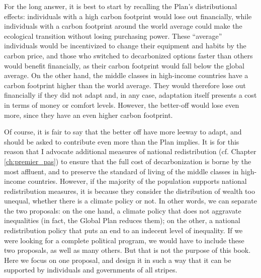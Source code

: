 \documentclass[a5paper,english,openany]{memoir}
\begin{document}
For the long answer, it is best to %
start by recalling the Plan's distributional effects: individuals with a high carbon footprint would lose out financially, while individuals with a carbon footprint around the world average could make the ecological transition %
without losing purchasing power. These ``average'' individuals would be incentivized %
to change their equipment and habits by the carbon price, and those who switched to decarbonized %
options faster than others would benefit financially, as their carbon footprint would fall below the global average. %
On the other hand, the middle classes in high-income countries have a carbon footprint higher %
than the world average. %
They would therefore lose out financially if they did not adapt and, in any case, adaptation itself presents a cost in terms of money or comfort levels. %
However, the better-off would lose even more, since they have an even higher carbon footprint. 

Of course, it is fair to say that the better off %
have more leeway to adapt, and should be asked to contribute even more than the Plan implies. It is for this reason that I advocate additional measures of national redistribution (cf. Chapter \ref{ch:premier_pas}) to ensure that the full cost of decarbonization %
is borne by the most affluent, and to preserve the standard of living of the middle classes in high-income countries. However, if the majority of the population supports national redistribution measures, it is because they consider the distribution of wealth too unequal, whether there is a climate policy or not. In other words, we can separate the two proposals: on the one hand, a climate policy that does not aggravate inequalities (in fact, the Global Plan reduces them); on the other, a national redistribution policy that puts an end to an indecent level of inequality. If we were looking for a complete political program, we would %
have to include these two proposals, as well as many others. But that is %
not the purpose of this book. Here we focus %
on one proposal, and design it in such a way that it can be supported by individuals and governments of all stripes. 
\end{document}
